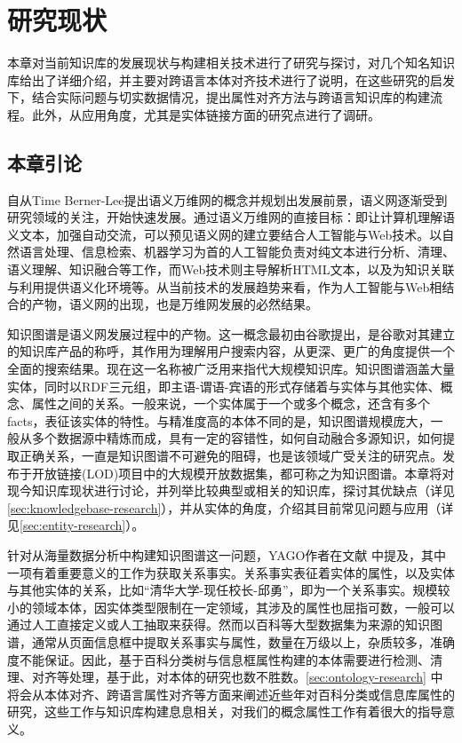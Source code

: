 \chapter{研究现状}
\label{cha:research}
本章对当前知识库的发展现状与构建相关技术进行了研究与探讨，对几个知名知识库给出了详细介绍，并主要对跨语言本体对齐技术进行了说明，在这些研究的启发下，结合实际问题与切实数据情况，提出属性对齐方法与跨语言知识库的构建流程。此外，从应用角度，尤其是实体链接方面的研究点进行了调研。

\section{本章引论}
自从Time Berner-Lee提出语义万维网的概念并规划出发展前景，语义网逐渐受到研究领域的关注，开始快速发展。通过语义万维网的直接目标：即让计算机理解语义文本，加强自动交流，可以预见语义网的建立要结合人工智能与Web技术。以自然语言处理、信息检索、机器学习为首的人工智能负责对纯文本进行分析、清理、语义理解、知识融合等工作，而Web技术则主导解析HTML文本，以及为知识关联与利用提供语义化环境等。从当前技术的发展趋势来看，作为人工智能与Web相结合的产物，语义网的出现，也是万维网发展的必然结果。

知识图谱是语义网发展过程中的产物。这一概念最初由谷歌提出，是谷歌对其建立的知识库产品的称呼，其作用为理解用户搜索内容，从更深、更广的角度提供一个全面的搜索结果。现在这一名称被广泛用来指代大规模知识库。知识图谱涵盖大量实体，同时以RDF三元组，即主语-谓语-宾语的形式存储着与实体与其他实体、概念、属性之间的关系。一般来说，一个实体属于一个或多个概念，还含有多个facts，表征该实体的特性。与精准度高的本体不同的是，知识图谱规模庞大，一般从多个数据源中精炼而成，具有一定的容错性，如何自动融合多源知识，如何提取正确关系，一直是知识图谱不可避免的阻碍，也是该领域广受关注的研究点。发布于开放链接(LOD)项目中的大规模开放数据集，都可称之为知识图谱。本章将对现今知识库现状进行讨论，并列举比较典型或相关的知识库，探讨其优缺点（详见\ref{sec:knowledgebase-research}），并从实体的角度，介绍其目前常见问题与应用（详见\ref{sec:entity-research}）。

针对从海量数据分析中构建知识图谱这一问题，YAGO作者在文献\cite{suchanek2014knowledge} 中提及，其中一项有着重要意义的工作为获取关系事实。关系事实表征着实体的属性，以及实体与其他实体的关系，比如“清华大学-现任校长-邱勇”，即为一个关系事实。规模较小的领域本体，因实体类型限制在一定领域，其涉及的属性也屈指可数，一般可以通过人工直接定义\cite{boyce2007developing}或人工抽取\cite{wang:movie}来获得。然而以百科等大型数据集为来源的知识图谱，通常从页面信息框中提取关系事实与属性，数量在万级以上，杂质较多，准确度不能保证。因此，基于百科分类树与信息框属性构建的本体需要进行检测、清理、对齐等处理，基于此，对本体的研究也数不胜数。\ref{sec:ontology-research} 中将会从本体对齐、跨语言属性对齐等方面来阐述近些年对百科分类或信息库属性的研究，这些工作与知识库构建息息相关，对我们的概念属性工作有着很大的指导意义。

